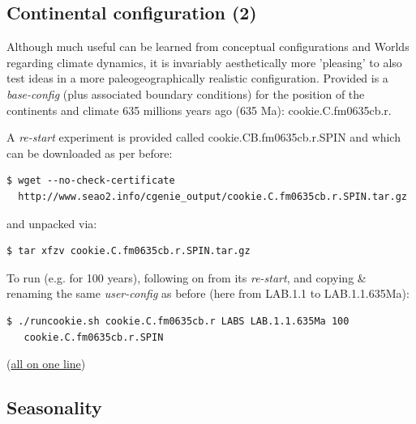 \subsection{Continental configuration (2)}

Although much useful can be learned from conceptual configurations and Worlds regarding climate dynamics, it is invariably aesthetically more 'pleasing' to also test ideas in a more paleogeographically realistic configuration. Provided is a \textit{base-config} (plus associated boundary conditions) for the position of the continents and climate 635 millions years ago (635 Ma): \textsf{\footnotesize cookie.C.fm0635cb.r}.

\vspace{1mm}
A \textit{re-start }experiment is provided called \textsf{\footnotesize cookie.CB.fm0635cb.r.SPIN} and which can be downloaded as per before:

\vspace{-2mm}\small\begin{verbatim}
$ wget --no-check-certificate 
  http://www.seao2.info/cgenie_output/cookie.C.fm0635cb.r.SPIN.tar.gz
\end{verbatim}\normalsize\vspace{-2mm}
and unpacked via:

\vspace{-2mm}\small\begin{verbatim}
$ tar xfzv cookie.C.fm0635cb.r.SPIN.tar.gz
\end{verbatim}\normalsize\vspace{-2mm}

To run (e.g. for 100 years), following on from its \textit{re-start}, and copying \& renaming the same \textit{user-config} as before (here from \textsf{\footnotesize LAB.1.1} to \textsf{\footnotesize LAB.1.1.635Ma}):

\vspace{-2mm}\small\begin{verbatim}
$ ./runcookie.sh cookie.C.fm0635cb.r LABS LAB.1.1.635Ma 100
   cookie.C.fm0635cb.r.SPIN
\end{verbatim}\normalsize\vspace{-2mm}
(\uline{all on one line})


\subsection{Seasonality}

